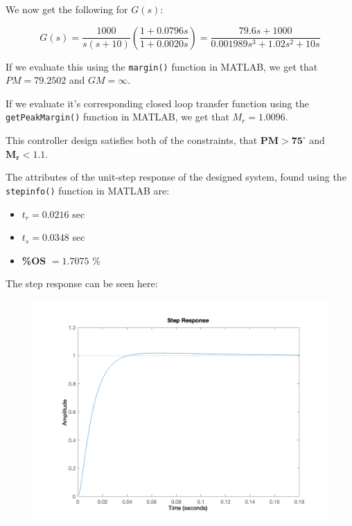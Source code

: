 \documentclass[12pt, letterpaper]{../assignment}
\begin{document}
We now get the following for $G(s)$:

$$ G(s) = \frac{1000}{s(s+10)}\left(\frac{1+0.0796 s}{1 + 0.0020s}\right)
    =  \frac{79.6 s + 1000}{0.001989 s^3 + 1.02 s^2 + 10 s} $$

\begin{answer}
    If we evaluate this using the \texttt{margin()} function in MATLAB,
    we get that $PM = 79.2502$ and $GM = \infty$.
\end{answer}

\begin{answer}
    If we evaluate it's corresponding closed loop transfer function using the \texttt{getPeakMargin()} function in MATLAB,
    we get that $M_r= 1.0096$.
\end{answer}

\begin{answer}
This controller design satisfies both of the constraints, that $\mathbf{PM > 75^\circ}$ and $\mathbf{M_r < 1.1}$.
\end{answer}

The attributes of the unit-step response of the designed system,
found using the \texttt{stepinfo()} function in MATLAB are:

\begin{answer}
\begin{itemize}
\item $t_r = 0.0216$ sec
\item $t_s = 0.0348$ sec
\item \textbf{\%OS} $= 1.7075$ \%
\end{itemize} 
\end{answer}

The step response can be seen here:

\begin{figure}[H]
    \centering
    \includegraphics[width=0.85\linewidth]{./figures/step_repsonse_designed_controller.png}
\end{figure}
\end{document}
